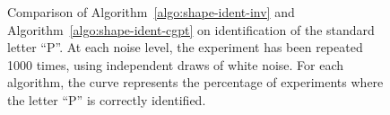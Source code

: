 \begin{figure}[htp]
  \centering
  \caption{Comparison of Algorithm~\ref{algo:shape-ident-inv} and
    Algorithm~\ref{algo:shape-ident-cgpt} on identification of the
    standard letter ``P''. At each noise level, the experiment has
    been repeated 1000 times, using independent draws of white
    noise. For each algorithm, the curve represents the percentage of
    experiments where the letter ``P'' is correctly identified. }
  \label{fig:algorithm_cgpt_vs_inv}
\end{figure}

